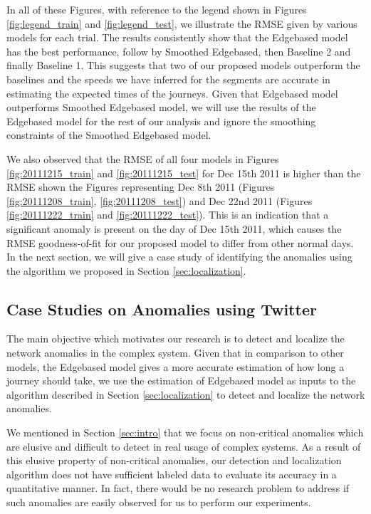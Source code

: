 \documentclass[draft]{sig-alternate}
\begin{document}
In all of these Figures, with reference to the legend shown in Figures \ref{fig:legend_train} and \ref{fig:legend_test}, we illustrate the RMSE given by various models for each trial. The results consistently show that the Edgebased model has the best performance, follow by Smoothed Edgebased, then Baseline 2 and finally Baseline 1. This suggests that two of our proposed models outperform the baselines and the speeds we have inferred for the segments are accurate in estimating the expected times of the journeys. Given that Edgebased model outperforms Smoothed Edgebased model, we will use the results of the Edgebased model for the rest of our analysis and ignore the smoothing constraints of the Smoothed Edgebased model.

We also observed that the RMSE of all four models in Figures \ref{fig:20111215_train} and \ref{fig:20111215_test} for Dec 15th 2011 is higher than the RMSE shown the Figures representing Dec 8th 2011 (Figures \ref{fig:20111208_train}, \ref{fig:20111208_test}) and Dec 22nd 2011 (Figures \ref{fig:20111222_train} and \ref{fig:20111222_test}). This is an indication that a significant anomaly is present on the day of Dec 15th 2011, which causes the RMSE goodness-of-fit for our proposed model to differ from other normal days. In the next section, we will give a case study of identifying the anomalies using the algorithm we proposed in Section \ref{sec:localization}.

\subsection{Case Studies on Anomalies using Twitter}

The main objective which motivates our research is to detect and localize the network anomalies in the complex system. Given that in comparison to other models, the Edgebased model gives a more accurate estimation of how long a journey should take, we use the estimation of Edgebased model as inputs to the algorithm described in Section \ref{sec:localization} to detect and localize the network anomalies.

We mentioned in Section \ref{sec:intro} that we focus on non-critical anomalies which are elusive and difficult to detect in real usage of complex systems. As a result of this elusive property of non-critical anomalies, our detection and localization algorithm does not have sufficient labeled data to evaluate its accuracy in a quantitative manner. In fact, there would be no research problem to address if such anomalies are easily observed for us to perform our experiments.
\end{document}
